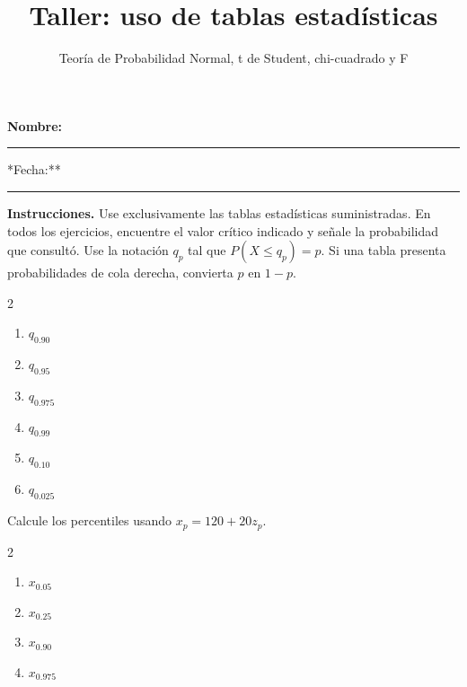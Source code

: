 \documentclass[
  spanish,
  12pt,
  letterpaper]{article}
\title{Taller: uso de tablas estadísticas}
\subtitle{Teoría de Probabilidad \textbar{} Normal, t de Student,
chi-cuadrado y F}
\author{}
\date{\vspace{-2.5em}}
\begin{document}
\maketitle

\vspace{-1.1cm}

\textbf{Nombre:}

\rule{9cm}{0.4pt}

\hfill **Fecha:**

\rule{2.4cm}{0.4pt}

\par\vspace{3pt}

\textbf{Instrucciones.} Use exclusivamente las tablas estadísticas
suministradas. En todos los ejercicios, encuentre el valor crítico
indicado y señale la probabilidad que consultó. Use la notación \(q_p\)
tal que \(P(X\leq q_p)=p\). Si una tabla presenta probabilidades de cola
derecha, convierta \(p\) en \(1-p\).

\par\vspace{3pt}

\begin{multicols}{2}
\begin{enumerate}[label=\alph*)]
\item $q_{0.90}$
\item $q_{0.95}$
\item $q_{0.975}$
\item $q_{0.99}$
\item $q_{0.10}$
\item $q_{0.025}$
\end{enumerate}
\end{multicols}

\par\vspace{3pt}

Calcule los percentiles usando \(x_p=120+20z_p\).

\begin{multicols}{2}
\begin{enumerate}[label=\alph*)]
\item $x_{0.05}$
\item $x_{0.25}$
\item $x_{0.90}$
\item $x_{0.975}$
\end{enumerate}
\end{multicols}
\end{document}
